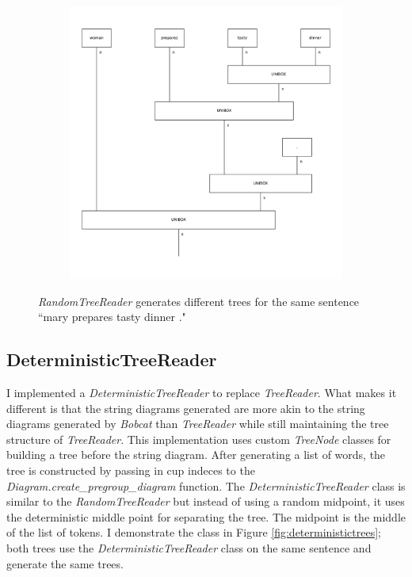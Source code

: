 \documentclass[12pt ]{article}
\begin{document}
\begin{figure}[t!]
\begin{subfigure}[t]{0.5\textwidth}
        \includegraphics[width=\textwidth]{../test/output/random_2.pdf}
    \end{subfigure}
    \label{fig:randomtrees}
    \caption{{\it RandomTreeReader} generates different trees for the same sentence ``mary prepares tasty dinner ."}
\end{figure}

\subsection{DeterministicTreeReader}
I implemented a {\it DeterministicTreeReader} to replace {\it TreeReader}. What makes it different is that the string diagrams generated are more akin to the string diagrams generated by {\it Bobcat} than {\it TreeReader} while still maintaining the tree structure of {\it TreeReader}. This implementation uses custom {\it TreeNode} classes for building a tree before the string diagram. After generating a list of words, the tree is constructed by passing in cup indeces to the {\it Diagram.create\_pregroup\_diagram} function.
The {\it DeterministicTreeReader} class is similar to the {\it RandomTreeReader} but instead of using a random midpoint, it uses the deterministic middle point for separating the tree.   The midpoint is the middle of the list of tokens. I demonstrate the class in Figure \ref{fig:deterministictrees}; both trees use the {\it DeterministicTreeReader} class on the same sentence and generate the same trees.
\end{document}
